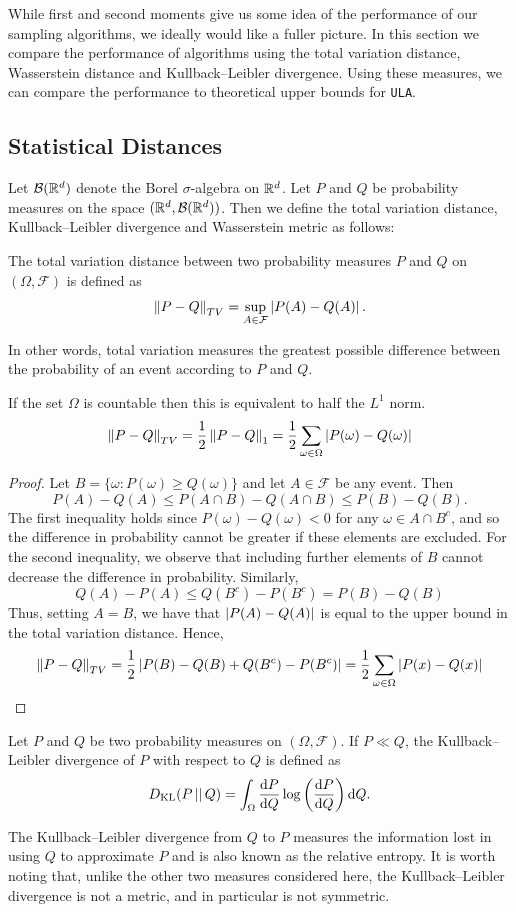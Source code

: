 While first and second moments give us some idea of the performance of our sampling algorithms, we ideally would like a fuller picture.  In this section we compare the performance of algorithms using the total variation distance, Wasserstein distance and Kullback--Leibler divergence.  Using these measures, we can compare the performance to theoretical upper bounds for \texttt{ULA}.

\subsection{Statistical Distances}
Let $\mathcal{B}(\mathbb{R}^d)$ denote the Borel $\sigma$-algebra on $\mathbb{R}^d$. Let $P$ and $Q$ be probability measures on the space $(\mathbb{R}^d, \mathcal{B}(\mathbb{R}^d))$.  Then we define the total variation distance, Kullback--Leibler divergence and Wasserstein metric as follows:

\begin{defn}
The total variation distance between two probability measures $P$ and $Q$ on $(\Omega, \mathcal{F})$ is defined as
$$
\norm{P - Q}_{TV} = \sup_{A \in \mathcal{F}} \abs{P(A) - Q(A)}.
$$
\end{defn}
In other words, total variation measures the greatest possible difference between the probability of an event according to $P$ and $Q$.
\begin{prop}
If the set $\Omega$ is countable then this is equivalent to half the $L^1$ norm.
$$
\norm{P - Q}_{TV} = \frac{1}{2} \norm{P-Q}_1 = \frac{1}{2} \sum_{\omega \in \Omega} \abs{P(\omega) - Q(\omega)}
$$
\end{prop}
\begin{proof}
Let $B = \{\omega: P(\omega) \geq Q(\omega)\}$ and let $A \in \mathcal{F}$ be any event.  Then
$$
P(A) - Q(A) \leq P(A \cap B) - Q(A \cap B) \leq P(B) - Q(B).
$$
The first inequality holds since $P(\omega)-Q(\omega) < 0$ for any $\omega \in A \cap B^c$, and so the difference in probability cannot be greater if these elements are excluded.  For the second inequality, we observe that including further elements of $B$ cannot decrease the difference in probability.
Similarly,
$$
Q(A) - P(A) \leq Q(B^c) - P(B^c) = P(B) - Q(B)
$$
Thus, setting $A=B$, we have that $\abs{P(A)-Q(A)}$ is equal to the upper bound in the total variation distance.  Hence,
$$
\norm{P-Q}_{TV} = \frac{1}{2} \abs{P(B)-Q(B)+Q(B^c)-P(B^c)} = \frac{1}{2} \sum_{\omega \in \Omega} \abs{P(x)-Q(x)}
$$
\end{proof}

\begin{defn}
Let $P$ and $Q$ be two probability measures on $(\Omega, \mathcal{F})$.  If $P \ll Q$, the Kullback--Leibler divergence of $P$ with respect to $Q$ is defined as
$$
D_{\text{KL}}(P\,||\,Q) = \int_\Omega \od{P}{Q} \log \left(  \od{P}{Q} \right) \dif  Q.
$$
\end{defn}
The Kullback--Leibler divergence from $Q$ to $P$ measures the information lost in using $Q$ to approximate $P$  \cite{anderson2004model} and is also known as the relative entropy.  It is worth noting that, unlike the other two measures considered here, the Kullback--Leibler divergence is not a metric, and in particular is not symmetric.

